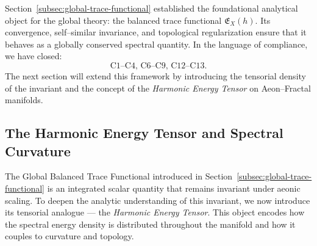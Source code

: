 
\begin{remark}
Section~\ref{subsec:global-trace-functional} established
the foundational analytical object for the global theory:
the balanced trace functional \(\mathfrak{E}_X(h)\).
Its convergence, self–similar invariance,
and topological regularization ensure that it behaves
as a globally conserved spectral quantity.
In the language of compliance, we have closed:
\[
\text{C1–C4, C6–C9, C12–C13.}
\]
The next section will extend this framework
by introducing the tensorial density of the invariant
and the concept of the \emph{Harmonic Energy Tensor}
on Aeon–Fractal manifolds.
\end{remark}


\subsection{The Harmonic Energy Tensor and Spectral Curvature}
\label{subsec:harmonic-energy-tensor}
\relax \hspace{0pt}


The Global Balanced Trace Functional introduced in Section~\ref{subsec:global-trace-functional}
is an integrated scalar quantity that remains invariant under aeonic scaling.
To deepen the analytic understanding of this invariant,
we now introduce its tensorial analogue — the \emph{Harmonic Energy Tensor}.
This object encodes how the spectral energy density is distributed
throughout the manifold and how it couples to curvature and topology.

